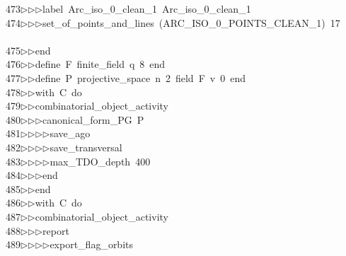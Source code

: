 \begin{tabbing}
473\>$\triangleright$\>$\triangleright$\>$\triangleright$\>label\ Arc\_iso\_0\_clean\_1\ Arc\_iso\_0\_clean\_1\ \\[0pt]
474\>$\triangleright$\>$\triangleright$\>$\triangleright$\>set\_of\_points\_and\_lines\ (ARC\_ISO\_0\_POINTS\_CLEAN\_1)\ 17\\[0pt]
\>\ \\[0pt]
475\>$\triangleright$\>$\triangleright$\>end\ \\[0pt]
476\>$\triangleright$\>$\triangleright$\>define\ F\ finite\_field\ q\ 8\ end\ \\[0pt]
477\>$\triangleright$\>$\triangleright$\>define\ P\ projective\_space\ n\ 2\ field\ F\ v\ 0\ end\ \\[0pt]
478\>$\triangleright$\>$\triangleright$\>with\ C\ do\ \\[0pt]
479\>$\triangleright$\>$\triangleright$\>combinatorial\_object\_activity\ \\[0pt]
480\>$\triangleright$\>$\triangleright$\>$\triangleright$\>canonical\_form\_PG\ P\ \\[0pt]
481\>$\triangleright$\>$\triangleright$\>$\triangleright$\>$\triangleright$\>save\_ago\ \\[0pt]
482\>$\triangleright$\>$\triangleright$\>$\triangleright$\>$\triangleright$\>save\_transversal\ \\[0pt]
483\>$\triangleright$\>$\triangleright$\>$\triangleright$\>$\triangleright$\>max\_TDO\_depth\ 400\ \\[0pt]
484\>$\triangleright$\>$\triangleright$\>$\triangleright$\>end\ \\[0pt]
485\>$\triangleright$\>$\triangleright$\>end\ \\[0pt]
486\>$\triangleright$\>$\triangleright$\>with\ C\ do\ \\[0pt]
487\>$\triangleright$\>$\triangleright$\>combinatorial\_object\_activity\ \\[0pt]
488\>$\triangleright$\>$\triangleright$\>$\triangleright$\>report\ \\[0pt]
489\>$\triangleright$\>$\triangleright$\>$\triangleright$\>$\triangleright$\>export\_flag\_orbits\ \\[0pt]

\end{tabbing}

